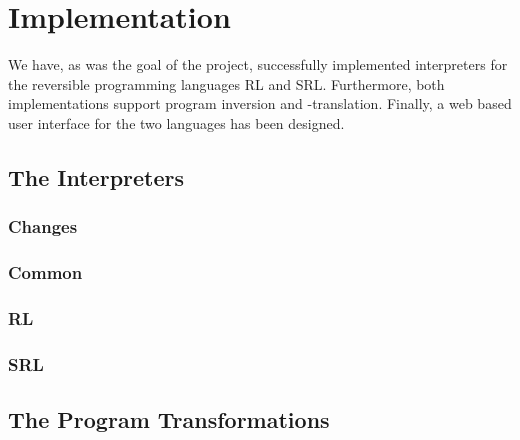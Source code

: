 \chapter*{Implementation}
%

We have, as was the goal of the project, successfully implemented interpreters for the reversible programming languages RL and SRL. Furthermore, both implementations support program inversion and -translation. Finally, a web based user interface for the two languages has been designed.






\section*{The Interpreters}
%

\subsection*{Changes}
%

\subsection*{Common}
%

\subsection*{RL}
%

\subsection*{SRL}
%






\section*{The Program Transformations}
%

